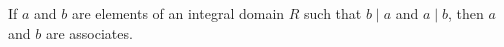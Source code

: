 If $a$ and $b$ are elements of an integral domain $R$ such that $b \mid a$ and $a \mid b$, then $a$ and $b$ are associates.
